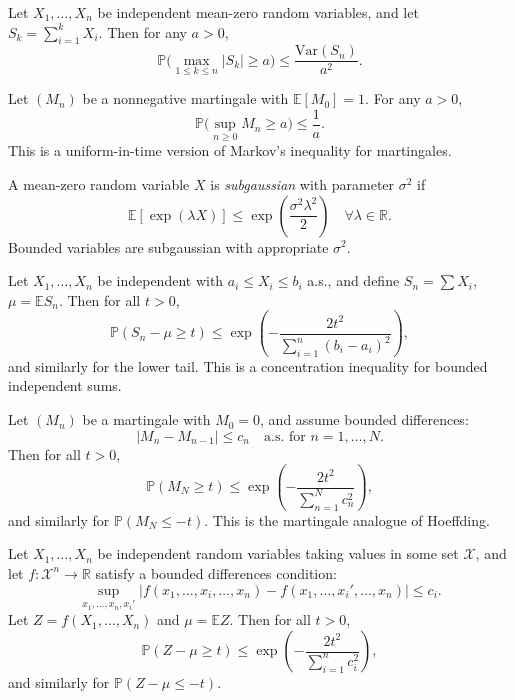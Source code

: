 \documentclass[answers,12pt,addpoints]{exam}
\begin{document}
\begin{theorem}
Let $X_1,\dots,X_n$ be independent mean-zero random variables, and let $S_k = \sum_{i=1}^k X_i$. Then for any $a>0$,
\[
\mathbb{P}\Big(\max_{1\le k\le n} |S_k| \ge a\Big) \le \frac{\mathrm{Var}(S_n)}{a^2}.
\]
\end{theorem}

\begin{theorem}
Let $(M_n)$ be a nonnegative martingale with $\mathbb{E}[M_0]=1$. For any $a>0$,
\[
\mathbb{P}\Big(\sup_{n\ge 0} M_n \ge a\Big) \le \frac{1}{a}.
\]
This is a uniform-in-time version of Markov's inequality for martingales.
\end{theorem}

\begin{definition}
A mean-zero random variable $X$ is \emph{subgaussian} with parameter $\sigma^2$ if
\[
\mathbb{E}[\exp(\lambda X)] \le \exp\left(\frac{\sigma^2\lambda^2}{2}\right) \quad \forall \lambda\in\mathbb{R}.
\]
Bounded variables are subgaussian with appropriate $\sigma^2$.
\end{definition}

\begin{theorem}
Let $X_1,\dots,X_n$ be independent with $a_i\le X_i\le b_i$ a.s., and define $S_n = \sum X_i$, $\mu = \mathbb{E}S_n$. Then for all $t>0$,
\[
\mathbb{P}(S_n - \mu \ge t) \le \exp\left(-\frac{2t^2}{\sum_{i=1}^n (b_i-a_i)^2}\right),
\]
and similarly for the lower tail. This is a concentration inequality for bounded independent sums.
\end{theorem}

\begin{theorem}
Let $(M_n)$ be a martingale with $M_0=0$, and assume bounded differences:
\[
|M_n - M_{n-1}|\le c_n \quad \text{a.s.\ for }n=1,\dots,N.
\]
Then for all $t>0$,
\[
\mathbb{P}(M_N \ge t) \le \exp\left(-\frac{2t^2}{\sum_{n=1}^N c_n^2}\right),
\]
and similarly for $\mathbb{P}(M_N \le -t)$. This is the martingale analogue of Hoeffding.
\end{theorem}

\begin{theorem}
Let $X_1,\dots,X_n$ be independent random variables taking values in some set $\mathcal{X}$, and let $f:\mathcal{X}^n\to\mathbb{R}$ satisfy a bounded differences condition:
\[
\sup_{x_1,\dots,x_n,x_i'} |f(x_1,\dots,x_i,\dots,x_n) - f(x_1,\dots,x_i',\dots,x_n)| \le c_i.
\]
Let $Z = f(X_1,\dots,X_n)$ and $\mu = \mathbb{E}Z$. Then for all $t>0$,
\[
\mathbb{P}(Z-\mu \ge t) \le \exp\left(-\frac{2t^2}{\sum_{i=1}^n c_i^2}\right),
\]
and similarly for $\mathbb{P}(Z-\mu \le -t)$.
\end{theorem}
\end{document}
